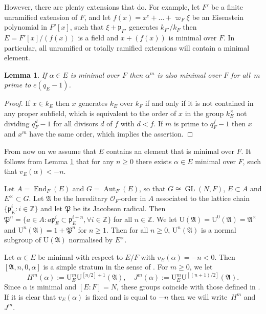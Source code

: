 \documentclass[11pt]{article}
\let\mathcal\mathscr
\newtheorem{lem}[prop]{Lemma}
\theoremstyle{definition}
\DeclareMathOperator{\Aut}{Aut}
\DeclareMathOperator{\End}{End}
\DeclareMathOperator{\GL}{GL}
\newcommand{\ZZ}{\mathbb Z}
\newcommand{\Aa}{\mathfrak A}
\newcommand{\Pp}{\mathfrak P}
\newcommand{\cO}{\mathcal{O}}
\newcommand{\pp}{\mathfrak p}
\newcommand{\UU}{\mathrm U}
\begin{document}
However, there are plenty extensions that do. For example, let $F'$ be a finite unramified extension of $F$,
and let $f(x)=x^e+\ldots + \varpi_F \xi$ be an Eisenstein polynomial in $F'[x]$, such that $\xi +\pp_{F'}$ generates $k_{F'}/k_F$ then $E=F'[x]/(f(x))$ is a
field and $x +(f(x))$ is minimal over $F$. In particular, all unramified or totally ramified extensions will contain a minimal element.

\begin{lem}\label{many_min} If $\alpha\in E$ is minimal over $F$ then $\alpha^m$ is also minimal over $F$ for all~$m$ prime to $e(q_E-1)$.
\end{lem}

\begin{proof} If $x\in k_E$ then $x$ generates $k_E$ over $k_F$ if and only if it is not contained in any proper subfield, which
is equivalent to the order of $x$ in the group $k_E^{\times}$ not dividing $q_F^d-1$ for all divisors $d$ of $f$ with $d<f$.
If $m$ is prime to $q_F^f-1$ then $x$ and $x^m$ have the same order, which implies the assertion.
\end{proof}

From now on we assume that $E$ contains an element that is minimal over $F$. It follows from Lemma \ref{many_min} that for any $n\ge 0$ there
exists $\alpha\in E$ minimal over $F$, such that $v_E(\alpha)< -n$.

Let $A=\End_F(E)$ and $G=\Aut_F(E)$, so that $G\cong \GL(N, F)$, $E\subset A$ and $E^{\times}\subset G$. Let $\mathfrak A$ be the hereditary $\cO_F$-order in $A$ associated to
the lattice chain $\{\pp_E^i: i\in \ZZ\}$ and let $\Pp$ be its Jacobson radical. Then $\Pp^n = \{a\in A: a \pp_E^i\subset \pp_E^{i+n}, \forall i\in \ZZ\}$ for all $n\in \ZZ$.
We let $\UU(\Aa)=\UU^0(\Aa)= \Aa^{\times}$ and $\UU^n(\Aa)=1+ \Pp^n$ for $n\ge 1$. Then for all $n\ge 0$, $\UU^n(\Aa)$ is a normal subgroup of $\UU(\Aa)$ normalised by $E^{\times}$.

Let $\alpha\in E$ be minimal with respect to $E/F$ with $v_E(\alpha)=-n<0$. Then $[\Aa, n, 0, \alpha]$ is a simple stratum in the sense of \cite[(1.5.5)]{BK}. For $m\ge 0$, we let
\[
H^{m}(\alpha):= \UU_E^m \UU^{[n/2]+1}(\Aa), \quad J^m(\alpha):= \UU_E^m \UU^{[(n+1)/2]}(\Aa).
\]
Since $\alpha$ is minimal and $[E:F]=N$, these groups coincide with those defined in \hbox{\cite[(3.1.14)]{BK}}. If it is clear that $v_E(\alpha)$ is fixed and is equal to $-n$ then we will
write~$H^{m}$ and $J^m$.
\end{document}
